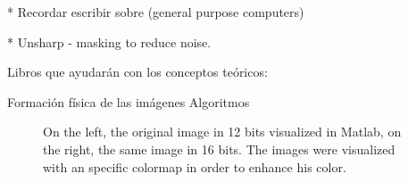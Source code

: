 * Recordar escribir sobre (general purpose computers)


* Unsharp - masking to reduce noise.


Libros que ayudarán con los conceptos teóricos:


Formación física de las imágenes
Algoritmos

\begin{figure}[h!]
  \begin{center}
    \hspace{\fill}
    \hfill
    \hspace{\fill}

  \caption[Comparison between 12 and 16 bits images]{On the left, the original
  image in 12 bits visualized in Matlab, on the right, the same image in 16
  bits. The images were visualized with an specific colormap in order to
  enhance his color.} 

  \end{center}
  \label{bitconversionimage} 
\end{figure}


